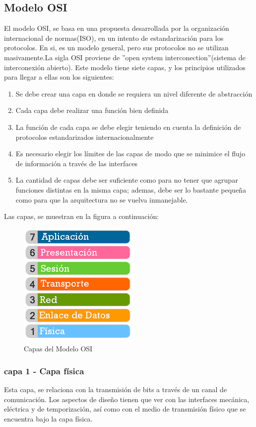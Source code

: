 \subsection{Modelo OSI}
El modelo OSI, se basa en una propuesta desarrollada por la organización internacional de normas(ISO), en un intento de estandarización para los protocolos. En si, es un modelo general, pero sus protocolos no se utilizan masivamente.La sigla OSI proviene de ''open system interconection''(sistema de interconexión abierto). Este modelo tiene siete capas, y los principios utilizados para llegar a ellas son los siguientes:
\begin{enumerate}
	\item Se debe crear una capa en donde se requiera un nivel diferente de abstracción 
	\item Cada capa debe realizar una función bien definida 
	\item La función de cada capa se debe elegir teniendo en cuenta la definición de protocolos estandarizados
	internacionalmente
	\item Es necesario elegir los límites de las capas de modo que se minimice el flujo de información a través de las interfaces 
	\item La cantidad de capas debe ser suficiente como para no tener que agrupar funciones distintas en
	la misma capa; ademas, debe ser lo bastante pequeña como para que la arquitectura no se vuelva
	inmanejable. 
\end{enumerate} 
Las capas, se muestran en la figura a continuación:%
\vspace{-2mm}  
\begin{figure}[ht]
	\centering
	\includegraphics[scale=0.5]{modelosi} 
	\caption{Capas del Modelo OSI}
	\label{fig:mod_osi}
\end{figure}  


\subsubsection{capa 1 - Capa física} 
Esta capa, se relaciona con la transmisión de bits a través de un canal de comunicación. Los aspectos de diseño tienen que ver con las interfaces mecánica, eléctrica y de temporización, así como con el medio de transmisión físico que se encuentra bajo la capa física.


